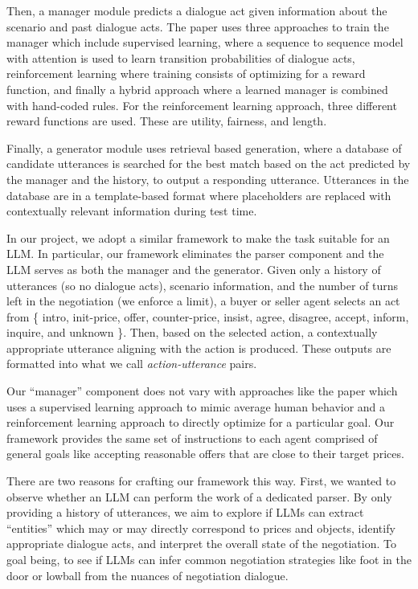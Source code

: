 \documentclass[11pt]{article}
\begin{document}
Then, a manager module predicts a dialogue act given information about the scenario and past dialogue acts. The paper uses three approaches to train the manager which include supervised learning, where a sequence to sequence model with attention is used to learn transition probabilities of dialogue acts, reinforcement learning where training consists of optimizing for a reward function, and finally a hybrid approach where a learned manager is combined with hand-coded rules. For the reinforcement learning approach, three different reward functions are used. These are utility, fairness, and length. 

Finally, a generator module uses retrieval based generation, where a database of candidate utterances is searched for the best match based on the act predicted by the manager and the history, to output a responding utterance. Utterances in the database are in a template-based format where placeholders are replaced with contextually relevant information during test time. 

In our project, we adopt a similar framework to make the task suitable for an LLM. In particular, our framework eliminates the parser component and the LLM serves as both the manager and the generator. Given only a history of utterances (so no dialogue acts), scenario information, and the number of turns left in the negotiation (we enforce a limit), a buyer or seller agent selects an act from \{ intro, init-price, offer, counter-price, insist, agree, disagree, accept, inform, inquire, and unknown \}. Then, based on the selected action, a contextually appropriate utterance aligning with the action is produced. These outputs are formatted into what we call \textit{action-utterance} pairs. 

Our “manager” component does not vary with approaches like the paper which uses a supervised learning approach to mimic average human behavior and a reinforcement learning approach to directly optimize for a particular goal. Our framework provides the same set of instructions to each agent comprised of general goals like accepting reasonable offers that are close to their target prices.  

There are two reasons for crafting our framework this way. First, we wanted to observe whether an LLM can perform the work of a dedicated parser. By only providing a history of utterances, we aim to explore if LLMs can extract “entities” which may or may directly correspond to prices and objects, identify appropriate dialogue acts, and interpret the overall state of the negotiation. To goal being, to see if LLMs can infer common negotiation strategies like foot in the door or lowball from the nuances of negotiation dialogue. 
\end{document}
